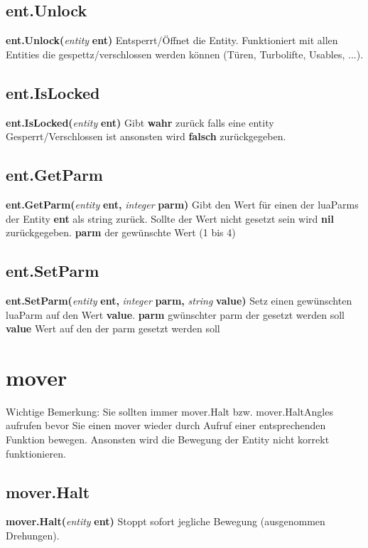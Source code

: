 \documentclass[11pt,a4paper]{book}
\begin{document}
\subsection{ent.Unlock}
\label{enty-unlock}
\textbf{ent.Unlock(}\textit{entity}\textbf{ ent)}
\newline
Entsperrt/Öffnet die Entity. Funktioniert mit allen Entities die gespettz/verschlossen werden können (Türen, Turbolifte, Usables, ...).
\subsection{ent.IsLocked}
\label{enty-locked}
\textbf{ent.IsLocked(}\textit{entity}\textbf{ ent)}
\newline
Gibt \textbf{wahr} zurück falls eine entity Gesperrt/Verschlossen ist ansonsten wird \textbf{falsch} zurückgegeben.
\subsection{ent.GetParm}
\label{enty-getparm}
\textbf{ent.GetParm(}\textit{entity}\textbf{ ent, }\textit{integer}\textbf{ parm)}
\newline
Gibt den Wert für einen der luaParms der Entity \textbf{ent} als string zurück. Sollte der Wert nicht gesetzt sein wird \textbf{nil} zurückgegeben.
\newline
\textbf{parm} der gewünschte Wert (1 bis 4)
\subsection{ent.SetParm}
\label{enty-setparm}
\textbf{ent.SetParm(}\textit{entity }\textbf{ent, }\textit{integer }\textbf{parm, }\textit{string }\textbf{value)}
\newline
Setz einen gewünschten luaParm auf den Wert \textbf{value}.
\newline
\textbf{parm} gwünschter parm der gesetzt werden soll
\newline
\textbf{value} Wert auf den der parm gesetzt werden soll
\newpage
\section{mover}
\label{mver}
Wichtige Bemerkung: Sie sollten immer mover.Halt bzw. mover.HaltAngles aufrufen bevor Sie einen mover wieder durch Aufruf einer entsprechenden Funktion bewegen. Ansonsten wird die Bewegung der Entity nicht korrekt funktionieren.
\subsection{mover.Halt}
\label{mver-halt}
\textbf{mover.Halt(}\textit{entity}\textbf{ ent)}
\newline
Stoppt sofort jegliche Bewegung (ausgenommen Drehungen).
\end{document}
